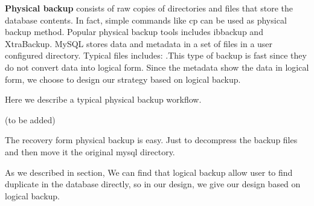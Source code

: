 \textbf{Physical backup} consists of raw copies of directories and files that store the database contents\citep{mysqlbackupdocumentation}. In fact, simple commands like cp can be used as physical backup method. Popular physical backup tools includes ibbackup and XtraBackup\citep{xtrabackup}. MySQL stores data and metadata in a set of files in a user configured directory. Typical files includes:  .This type of backup is fast since they do not convert data into logical form. Since the metadata show the data in logical form, we choose to design our strategy based on logical backup. 

Here we describe a typical physical backup workflow. 

(to be added)

The recovery form physical backup is easy. Just to decompress the backup files and then move it the original mysql directory. 




As we described in section, We can find that logical backup allow user to find duplicate in the database directly, so in our design, we give our design based on logical backup.

